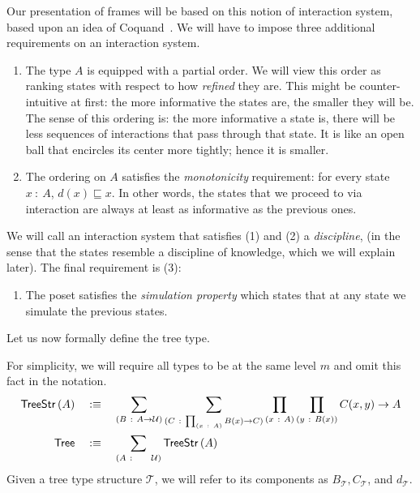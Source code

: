 Our presentation of frames will be based on this notion of interaction system, based upon
an idea of Coquand~\cite{coq-posets}. We will have to impose three additional requirements
on an interaction system.
\begin{enumerate}
  \item The type $A$ is equipped with a partial order. We will view this order as ranking
    states with respect to how \emph{refined} they are. This might be counter-intuitive at
    first: the more informative the states are, the smaller they will be. The sense of
    this ordering is: the more informative a state is, there will be less sequences of
    interactions that pass through that state. It is like an open ball that encircles its
    center more tightly; hence it is smaller.
  \item The ordering on $A$ satisfies the \emph{monotonicity} requirement: for every state
    $x~:~A$, $d(x) \sqsubseteq x$. In other words, the states that we proceed to via interaction are
    always at least as informative as the previous ones.
\end{enumerate}
We will call an interaction system that satisfies (1) and (2) a \emph{discipline}, (in the
sense that the states resemble a discipline of knowledge, which we will explain later).
The final requirement is (3):
\begin{enumerate}
  \item The poset satisfies the \emph{simulation property} which states that at any state
    we simulate the previous states.
\end{enumerate}

Let us now formally define the tree type.
\begin{defn}
  For simplicity, we will require all types to be at the same level $m$ and omit this fact
  in the notation.
  \begin{align*}
    \treestr{A} &\quad\is\quad
      \sigmaty{B}{A \rightarrow \univ}{
        \sigmaty{C}{\pity{x}{A}{B(x) \rightarrow C}}{
          \pity{x}{A}{\pity{y}{B(x)}{C(x, y) \rightarrow A}}
        }
      }\\
    \mathsf{Tree} &\quad\is\quad \sigmaty{A}{~~~~\univ}{\treestr{A}}
  \end{align*}
  Given a tree type structure $\mathcal{T}$, we will refer to its components as
  $B_{\mathcal{T}}, C_{\mathcal{T}}$, and $d_{\mathcal{T}}$.
\end{defn}

